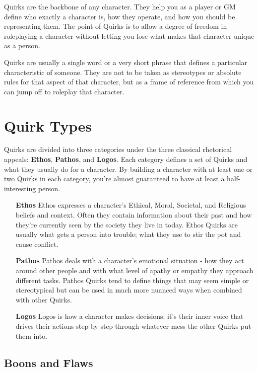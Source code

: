 \documentclass[../main.tex]{subfiles}
\begin{document}
    Quirks are the backbone of any character. They help you as a player or GM define who exactly a character is, how they operate, and how you should be representing them. The point of Quirks is to allow a degree of freedom in roleplaying a character without letting you lose what makes that character unique as a person.

    Quirks are usually a single word or a very short phrase that defines a particular characteristic of someone. They are not to be taken as stereotypes or absolute rules for that aspect of that character, but as a frame of reference from which you can jump off to roleplay that character. 
      
    \section{Quirk Types}

    Quirks are divided into three categories under the three classical rhetorical appeals: \textbf{Ethos}, \textbf{Pathos}, and \textbf{Logos}. Each category defines a set of Quirks and what they usually do for a character. By building a character with at least one or two Quirks in each category, you're almost guaranteed to have at least a half-interesting person.

    \begin{itemize}
        \item [\textbf{Ethos}] Ethos expresses a character's Ethical, Moral, Societal, and Religious beliefs and context. Often they contain information about their past and how they're currently seen by the society they live in today. Ethos Quirks are usually what gets a person into trouble; what they use to stir the pot and cause conflict.
        
        \item [\textbf{Pathos}] Pathos deals with a character's emotional situation - how they act around other people and with what level of apathy or empathy they approach different tasks. Pathos Quirks tend to define things that may seem simple or stereotypical but can be used in much more nuanced ways when combined with other Quirks.
        
        \item [\textbf{Logos}] Logos is how a character makes decisions; it's their inner voice that drives their actions step by step through whatever mess the other Quirks put them into.
    \end{itemize}

    \subsection{Boons and Flaws}
\end{document}

